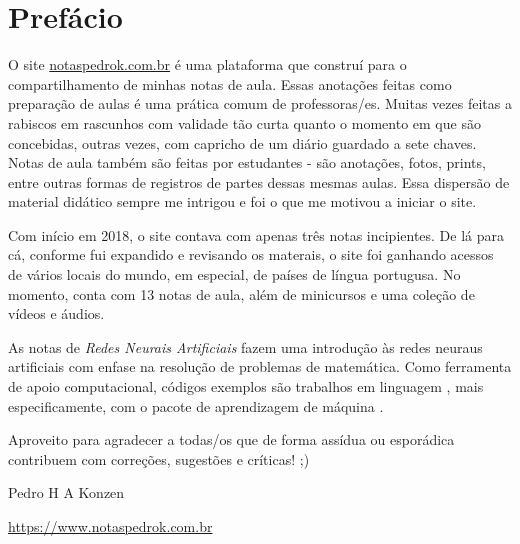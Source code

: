 
\chapter*{Prefácio}\label{prefacio}

O site \href{https://www.notaspedrok.com.br}{notaspedrok.com.br} é uma plataforma que construí para o compartilhamento de minhas notas de aula. Essas anotações feitas como preparação de aulas é uma prática comum de professoras/es. Muitas vezes feitas a rabiscos em rascunhos com validade tão curta quanto o momento em que são concebidas, outras vezes, com capricho de um diário guardado a sete chaves. Notas de aula também são feitas por estudantes - são anotações, fotos, prints, entre outras formas de registros de partes dessas mesmas aulas. Essa dispersão de material didático sempre me intrigou e foi o que me motivou a iniciar o site.

Com início em 2018, o site contava com apenas três notas incipientes. De lá para cá, conforme fui expandido e revisando os materais, o site foi ganhando acessos de vários locais do mundo, em especial, de países de língua portugusa. No momento, conta com 13 notas de aula, além de minicursos e uma coleção de vídeos e áudios.

As notas de \emph{Redes Neurais Artificiais} fazem uma introdução às redes neuraus artificiais com enfase na resolução de problemas de matemática. Como ferramenta de apoio computacional, códigos exemplos são trabalhos em linguagem {\python}, mais especificamente, com o pacote de aprendizagem de máquina {\pytorch}.

Aproveito para agradecer a todas/os que de forma assídua ou esporádica contribuem com correções, sugestões e críticas! ;)

\begin{flushright}
  Pedro H A Konzen

  \url{https://www.notaspedrok.com.br}
\end{flushright}

